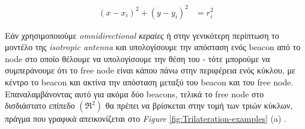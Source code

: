 \begin{align}
	(x-x_i)^2 + (y-y_i)^2 &= r_i^2 \label{eq:trilateration-circles}
\end{align}

Εάν χρησιμοποιούμε \emph{omnidirectional κεραίες} \cite{Omnidirectional-antenna} ή στην γενικότερη περίπτωση το μοντέλο της \emph{isotropic antenna} \cite{Isotropic-radiator} και υπολογίσουμε την απόσταση ενός beacon από το node στο οποίο θέλουμε να υπολογίσουμε την θέση του -
τότε μπορούμε να συμπεράνουμε ότι το free node είναι κάπου πάνω στην περιφέρεια ενός 
κύκλου, με κέντρο το beacon και ακτίνα την απόσταση μεταξύ του beacon και του free node. 
Επαναλαμβάνοντας αυτό για ακόμα δύο beacons, τελικά το free node στο δισδιάστατο επίπεδο $(\mathfrak{R}^2)$ θα πρέπει να βρίσκεται στην τομή των τριών κύκλων, πράγμα που γραφικά 
απεικονίζεται στο \emph{Figure} \ref{fig:Trilateration-examples} (a) \cite{RSSI-trilateration-Range_based}.

